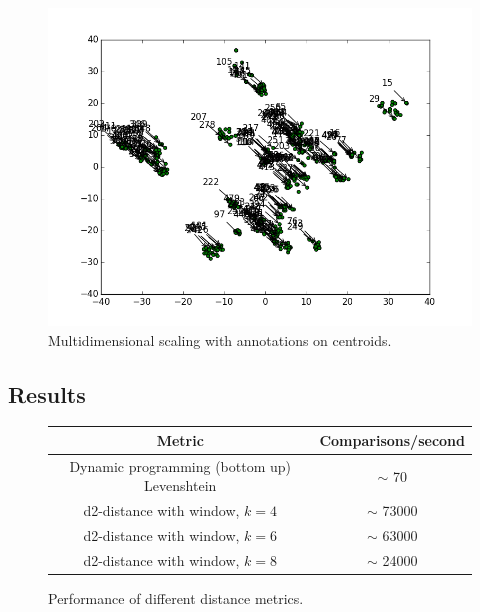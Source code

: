 \begin{figure}[h!]
  \centering
  \includegraphics[width=\textwidth]{graphics/MDS_t-SNE_SILVA_500.png}
  \caption{Multidimensional scaling with annotations on centroids.}
  \label{fig:mds_tsne}
\end{figure}



\subsection{Results}
\begin{figure}[H]
  \centering
  \begin{tabular}{ c | c }
    Metric                                        & Comparisons/second      \\
    \hline \hline
    Dynamic programming (bottom up) Levenshtein   & $\sim$ 70               \\
    \hline
    d2-distance with window, $k=4$                & $\sim$ 73000            \\
    \hline
    d2-distance with window, $k=6$                & $\sim$ 63000            \\
    \hline
    d2-distance with window, $k=8$                & $\sim$ 24000            \\
  \end{tabular}
  \caption{Performance of different distance metrics.}
\end{figure}

